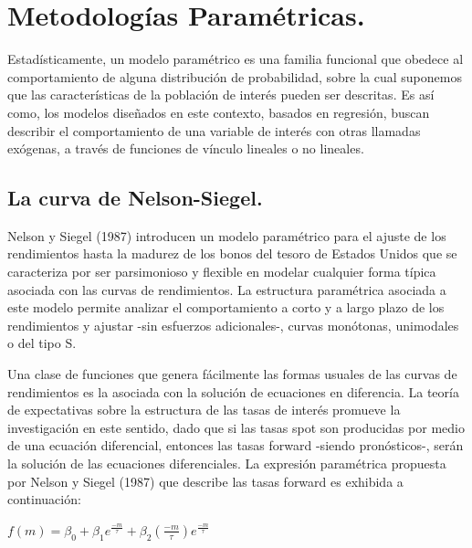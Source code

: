 \section{Metodolog\'ias Param\'etricas.}

\hspace*{0.4 cm} Estad\'isticamente, un modelo param\'etrico es una familia funcional que
obedece al comportamiento de alguna distribuci\'on de probabilidad, sobre la cual suponemos que las caracter\'isticas de la poblaci\'on de inter\'es
pueden ser descritas. Es as\'i como, los modelos dise\~nados en este contexto,
basados en regresi\'on, buscan describir el comportamiento de una
variable de inter\'es con otras llamadas ex\'ogenas, a trav\'es de funciones de
v\'inculo lineales o no lineales.

\subsection{La curva de Nelson-Siegel.\\} 

\hspace*{0.4 cm} Nelson y Siegel (1987) introducen un modelo param\'etrico para el ajuste
de los rendimientos hasta la madurez de los bonos del tesoro de Estados
Unidos que se caracteriza por ser parsimonioso y flexible en modelar
cualquier forma t\'ipica asociada con las curvas de rendimientos. La estructura
param\'etrica asociada a este modelo permite analizar el comportamiento
a corto y a largo plazo de los rendimientos y ajustar -sin
esfuerzos adicionales-, curvas mon\'otonas, unimodales o del tipo S.


\hspace*{0.4 cm} Una clase de funciones que genera f\'acilmente las formas usuales de las
curvas de rendimientos es la asociada con la soluci\'on de ecuaciones en
diferencia. La teor\'ia de expectativas sobre la estructura de las tasas de
inter\'es promueve la investigaci\'on en este sentido, dado que si las tasas
spot son producidas por medio de una ecuaci\'on diferencial, entonces las
tasas forward -siendo pron\'osticos-, ser\'an la soluci\'on de las ecuaciones
diferenciales. La expresi\'on param\'etrica propuesta por Nelson y Siegel
(1987) que describe las tasas forward es exhibida a continuaci\'on:


\begin{center}
$\displaystyle{f(m) = \beta_{0} + \beta_{1} e^{\frac{-m}{\tau}} +\beta_{2} \left(\frac{-m}{\tau}\right)e^{\frac{-m}{\tau}}}$
\end{center}

